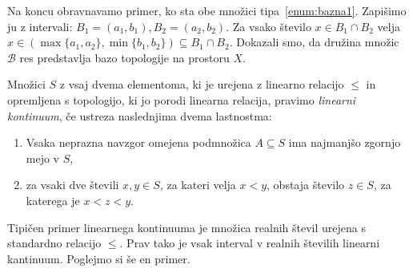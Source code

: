 \documentclass[../TG_magistrsko_delo_sections.tex]{subfiles}
\begin{document}
Na koncu obravnavamo primer, ko sta obe množici tipa~\ref{enum:bazna1}. Zapišimo ju z intervali: $B_1 = (a_1, b_1), B_2 =(a_2, b_2)$. Za vsako število $x \in B_1 \cap B_2$ velja $x \in (\max\{a_1, a_2\}, \min\{b_1, b_2\}) \subseteq B_1 \cap B_2$. Dokazali smo, da družina množic $\mathcal{B}$ res predstavlja bazo topologije na prostoru $X$.

\begin{definicija}
Množici $S$ z vsaj dvema elementoma, ki je urejena z linearno relacijo $\leq$ in opremljena s topologijo, ki jo porodi linearna relacija, pravimo \emph{linearni kontinuum}, če ustreza naslednjima dvema lastnostma:
\begin{enumerate}
\item Vsaka neprazna navzgor omejena podmnožica $A \subseteq S$ ima najmanjšo zgornjo mejo v $S$,\label{enum:L1}
\item za vsaki dve števili $x, y \in S$, za kateri velja $x<y$, obstaja število $z \in S$, za katerega je $x<z<y$.\label{enum:L2}
\end{enumerate}
\end{definicija}

Tipičen primer linearnega kontinuuma je množica realnih števil urejena s standardno relacijo $\leq$. Prav tako je vsak interval v realnih številih linearni kantinuum. Poglejmo si še en primer. 
\end{document}
